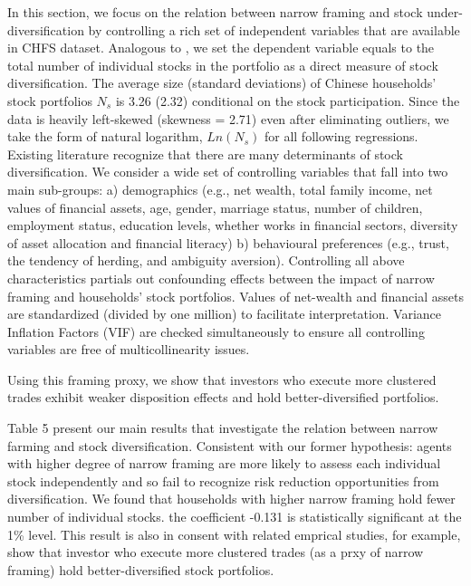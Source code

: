 \documentclass[ukenglish,nottitlepage,thmsb,11pt,letterpaper]{article}
\begin{document}
In this section, we focus on the relation between narrow framing and stock under-diversification by controlling a rich set of independent variables that are available in CHFS dataset. Analogous to \citet{Goetzmann2008}, we set the dependent variable equals to the total number of individual stocks in the portfolio as a direct measure of stock diversification. The average size (standard deviations) of Chinese households' stock portfolios $N_s$ is 3.26 (2.32) conditional on the stock participation. Since the data is heavily left-skewed (skewness = 2.71) even after eliminating outliers, we take the form of natural logarithm,  $Ln(N_s)$ for all following regressions. Existing literature recognize that there are many determinants of stock diversification. We consider a wide set of controlling variables that fall into two main sub-groups: a) demographics (e.g., net wealth, total family income, net values of financial assets, age, gender, marriage status, number of children, employment status, education levels, whether works in financial sectors, diversity of asset allocation and financial literacy) b) behavioural preferences (e.g., trust, the tendency of herding,  and ambiguity aversion). Controlling all above characteristics partials out confounding effects between the impact of narrow framing and  households' stock portfolios. Values of net-wealth and financial assets are standardized (divided by one million) to facilitate interpretation.  Variance Inflation Factors (VIF) are checked simultaneously to ensure all controlling variables are free of multicollinearity issues.




Using this framing proxy, we show that investors who execute more clustered trades
exhibit weaker disposition effects and hold better-diversified portfolios.


Table 5 present our main results that investigate the relation between narrow farming and stock diversification. Consistent with our former hypothesis: agents with higher degree of narrow framing are more likely to assess each individual stock independently and so fail to recognize risk reduction opportunities from diversification.  We found that households with higher narrow framing hold fewer number of individual stocks. the coefficient -0.131 is statistically significant at the 1\% level. This result is also in consent with related emprical studies, for example, \citet{Kumar2008} show that investor who execute more clustered trades (as a prxy of narrow framing) hold better-diversified stock portfolios.  
\end{document}
